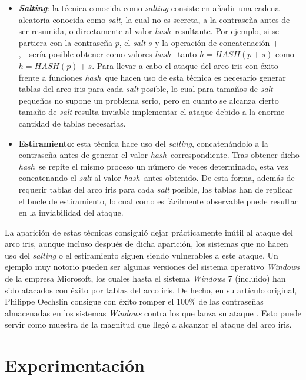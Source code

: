 \documentclass[12pt,spanish,listoffigures,listoftables]{tfgetsinf}
\newcommand{\hash}{\textit{hash}}
\begin{document}
\begin{itemize}

    \item \textbf{\textit{Salting}}: la técnica conocida como \textit{salting} consiste en añadir una cadena aleatoria conocida como \textit{salt}, la cual no es secreta, a la contraseña antes de ser resumida, o directamente al valor \hash~resultante. Por ejemplo, si se partiera con la contraseña $p$, el \textit{salt} $s$ y la operación de concatenación $+$,~~sería posible obtener como valores \hash~ tanto $h = HASH(p+s)$ como $h = HASH(p)+s$. Para llevar a cabo el ataque del arco iris con éxito frente a funciones \hash~que hacen uso de esta técnica es necesario generar tablas del arco iris para cada \textit{salt} posible, lo cual para tamaños de \textit{salt} pequeños no supone un problema serio, pero en cuanto se alcanza cierto tamaño de \textit{salt} resulta inviable implementar el ataque debido a la enorme cantidad de tablas necesarias.
    
    \item \textbf{Estiramiento}: esta técnica hace uso del \textit{salting}, concatenándolo a la contraseña antes de generar el valor \hash~correspondiente. Tras obtener dicho \hash~se repite el mismo proceso un número de veces determinado, esta vez concatenando el \textit{salt} al valor \hash~antes obtenido. De esta forma, además de requerir tablas del arco iris para cada \textit{salt} posible, las tablas han de replicar el bucle de estiramiento, lo cual como es fácilmente observable puede resultar en la inviabilidad del ataque.
    
\end{itemize}

La aparición de estas técnicas consiguió dejar prácticamente inútil al ataque del arco iris, aunque incluso después de dicha aparición, los sistemas que no hacen uso del \textit{salting} o el estiramiento siguen siendo vulnerables a este ataque. Un ejemplo muy notorio pueden ser algunas versiones del sistema operativo \textit{Windows} de la empresa Microsoft, los cuales hasta el sistema \textit{Windows} 7 (incluido) han sido atacados con éxito por tablas del arco iris. De hecho, en su artículo original, Philippe Oechslin consigue con éxito romper el 100\% de las contraseñas almacenadas en los sistemas \textit{Windows} contra los que lanza su ataque \cite{rainbow}. Esto puede servir como muestra de la magnitud que llegó a alcanzar el ataque del arco iris.

\chapter{Experimentación}
\end{document}
